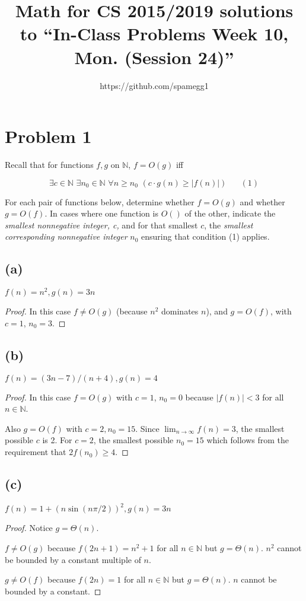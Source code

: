 \documentclass[14pt]{extarticle}
\title{Math for CS 2015/2019 solutions to ``In-Class Problems Week 10, Mon. (Session 24)''}
\author{https://github.com/spamegg1}
\newcommand{\dps}{\displaystyle}
\begin{document}
\maketitle
\tableofcontents

\section{Problem 1}
Recall that for functions $f, g$ on $\mathbb{N}$, $f = O(g)$ iff

$$
\exists c \in \mathbb{N} \,\, \exists n_0 \in \mathbb{N} \,\, \forall n \geq n_0 \,\, ( c \cdot g(n) \geq |f(n)|) \,\,\,\,\,\,\,\,\,\,(1)
$$

For each pair of functions below, determine whether $f = O(g)$ and whether $g = O(f)$. In cases where one function is $O()$ of the other, indicate the {\it smallest nonnegative integer, c,} and for that smallest $c$, the {\it smallest corresponding nonnegative integer} $n_0$ ensuring that condition (1) applies.
\subsection{(a)}
$f(n) = n^2, g(n) = 3n$
\begin{proof}
In this case $f \neq O(g)$ (because $n^2$ dominates $n$), and $g = O(f)$, with $c = 1$, $n_0 = 3$.
\end{proof}

\subsection{(b)}
$f(n) = (3n-7)/(n+4), g(n) = 4$
\begin{proof}
In this case $f = O(g)$ with $c = 1$, $n_0 = 0$ because $|f(n)| < 3$ for all $n \in \mathbb{N}$.

Also $g = O(f)$ with $c = 2, n_0 = 15$. Since $\dps\lim_{n\to\infty} f(n) = 3$, the smallest possible $c$ is 2. For $c = 2$, the smallest possible $n_0 = 15$ which follows from the requirement that $2 f(n_0) \geq 4$.
\end{proof}

\subsection{(c)}
$f(n) = 1+(n\sin(n\pi / 2))^2, g(n) = 3n$
\begin{proof}
Notice $g = \Theta(n)$.

$f \neq O(g)$ because $f(2n+1) = n^2+1$ for all $n \in \mathbb{N}$ but $g = \Theta(n)$. $n^2$ cannot be bounded by a constant multiple of $n$.

$g \neq O(f)$ because $f(2n) = 1$ for all $n \in \mathbb{N}$ but $g = \Theta(n)$. $n$ cannot be bounded by a constant.
\end{proof}
\end{document}
